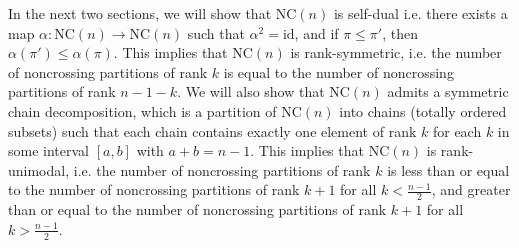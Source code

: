 In the next two sections, we will show that $\text{NC}(n)$ is self-dual i.e. there exists a map $\alpha: \text{NC}(n) \to \text{NC}(n)$ such that $\alpha^2 = \text{id}$, and if $\pi\le \pi'$, then $\alpha(\pi') \le \alpha(\pi)$. This implies that $\text{NC}(n)$ is rank-symmetric, i.e. the number of noncrossing partitions of rank $k$ is equal to the number of noncrossing partitions of rank $n-1-k$. We will also show that $\text{NC}(n)$ admits a symmetric chain decomposition, which is a partition of $\text{NC}(n)$ into chains (totally ordered subsets) such that each chain contains exactly one element of rank $k$ for each $k$ in some interval $[a,b]$ with $a+b=n-1$. This implies that $\text{NC}(n)$ is rank-unimodal, i.e. the number of noncrossing partitions of rank $k$ is less than or equal to the number of noncrossing partitions of rank $k+1$ for all $k < \frac{n-1}{2}$, and greater than or equal to the number of noncrossing partitions of rank $k+1$ for all $k > \frac{n-1}{2}$.